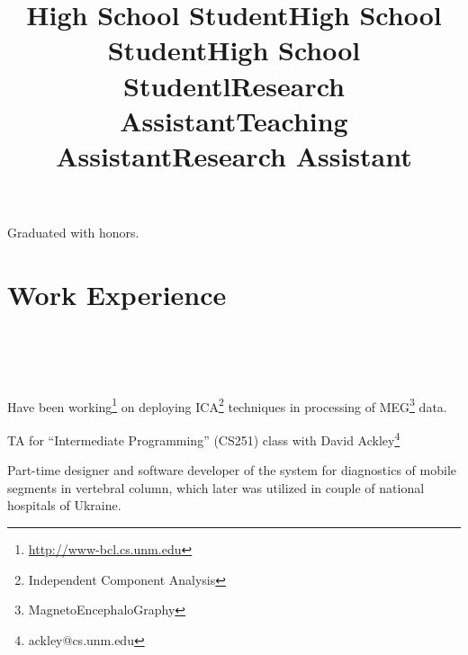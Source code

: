 \documentclass[10pt,overlapped,line]{res}
\begin{document}
\begin{resume}
\title{High School Student}
\begin{position}
 Graduated with honors.
\end{position}

\title{High School Student}
\begin{position}
\end{position}


\title{High School Student}
\begin{position}
\end{position}
 

\section{Work Experience}
\begin{format}
  \title{l}\\
  \\
  \body\\
\end{format}


\title{Research Assistant}
\begin{position}
 Have been working\footnote{\href{URL}{http://www-bcl.cs.unm.edu}} on deploying ICA\footnote{Independent Component Analysis} techniques in processing of
MEG\footnote{MagnetoEncephaloGraphy} data. 
\end{position}

\title{Teaching Assistant}
\begin{position}
  TA for ``Intermediate Programming'' (CS251) class with David
  Ackley\footnote{ackley@cs.unm.edu}
\end{position}


\title{Research Assistant}
\begin{position}
Part-time designer and software developer of the system for
diagnostics of mobile segments in vertebral column, which later was
utilized in couple of national hospitals of Ukraine.
\end{position}


\end{resume}
\end{document}
